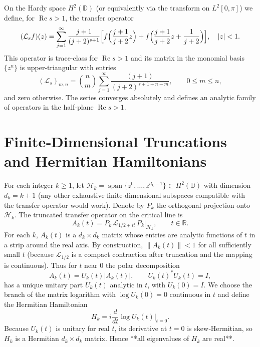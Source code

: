 \documentclass[11pt,a4paper]{article}
\theoremstyle{definition}
\theoremstyle{remark}
\newcommand{\bbR}{\mathbb{R}}
\begin{document}
On the Hardy space \(H^2(\mathbb{D})\) (or equivalently via the transform on \(L^2[0,\pi]\)) we define, for \(\operatorname{Re}s > 1\), the transfer operator
\begin{equation}\label{eq:Lsdef}
(\mathcal{L}_s f)(z) = \sum_{j=1}^{\infty} \frac{j+1}{(j+2)^{s+1}}
\Bigl[ f\Bigl(\frac{j+1}{j+2}z\Bigr) + f\Bigl(\frac{j+1}{j+2}z + \frac{1}{j+2}\Bigr) \Bigr], \quad |z|<1.
\end{equation}
This operator is trace‑class for \(\operatorname{Re}s > 1\) and its matrix in the monomial basis \(\{z^n\}\) is upper‑triangular with entries
\[
(\mathcal{L}_s)_{m,n} = \binom{n}{m} \sum_{j=1}^{\infty} \frac{(j+1)}{(j+2)^{s+1+n-m}}, \qquad 0\le m\le n,
\]
and zero otherwise.  The series converges absolutely and defines an analytic family of operators in the half‑plane \(\operatorname{Re}s > 1\).

\section{Finite‑Dimensional Truncations and Hermitian Hamiltonians}
\label{sec:trunc}

For each integer \(k\ge 1\), let \(\mathcal{H}_k = \operatorname{span}\{z^0,\dots,z^{d_k-1}\} \subset H^2(\mathbb{D})\) with dimension \(d_k = k+1\) (any other exhaustive finite‑dimensional subspaces compatible with the transfer operator would work).  Denote by \(P_k\) the orthogonal projection onto \(\mathcal{H}_k\).  The truncated transfer operator on the critical line is
\[
A_k(t) = P_k \,\mathcal{L}_{1/2+it}\, P_k\big|_{\mathcal{H}_k}, \qquad t\in\bbR.
\]
For each \(k\), \(A_k(t)\) is a \(d_k\times d_k\) matrix whose entries are analytic functions of \(t\) in a strip around the real axis.  By construction, \(\|A_k(t)\| < 1\) for all sufficiently small \(t\) (because \(\mathcal{L}_{1/2}\) is a compact contraction after truncation and the mapping is continuous).  Thus for \(t\) near \(0\) the polar decomposition
\[
A_k(t) = U_k(t) |A_k(t)|, \qquad U_k(t)^* U_k(t) = I,
\]
has a unique unitary part \(U_k(t)\) analytic in \(t\), with \(U_k(0)=I\).  We choose the branch of the matrix logarithm with \(\log U_k(0)=0\) continuous in \(t\) and define the Hermitian Hamiltonian
\begin{equation}\label{eq:Hkdef}
H_k = i \frac{d}{dt} \log U_k(t) \Big|_{t=0}.
\end{equation}
Because \(U_k(t)\) is unitary for real \(t\), its derivative at \(t=0\) is skew‑Hermitian, so \(H_k\) is a Hermitian \(d_k\times d_k\) matrix.  Hence **all eigenvalues of \(H_k\) are real**.
\end{document}
